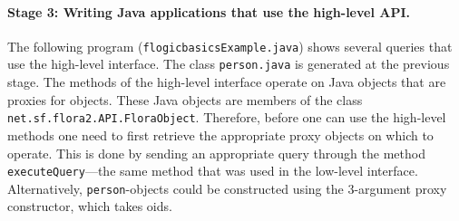 \paragraph{Stage 3: Writing Java applications that use the high-level API.}

The following program ({\tt flogicbasicsExample.java}) shows several
queries that use the high-level interface. The
class {\tt person.java} is generated at the previous stage.
The methods of the high-level interface operate on Java objects that are
proxies for \FLSYSTEM objects. These Java objects are members of the class
{\tt net.sf.flora2.API.FloraObject}.
Therefore, before one can use the high-level methods one need to first
retrieve the appropriate proxy objects on which to operate. This is done
by sending an appropriate query through the method {\tt executeQuery}---the
same method that was used in the low-level interface.
Alternatively, {\tt person}-objects could be constructed using the
3-argument proxy constructor, which takes \fl oids.


